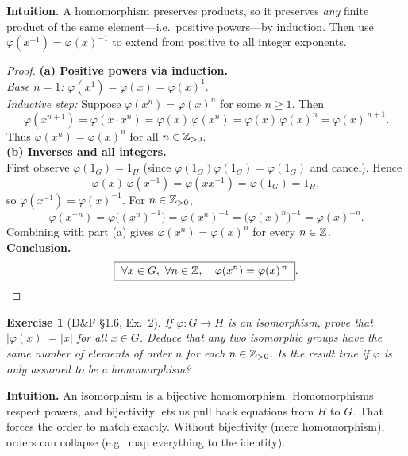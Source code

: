 \documentclass[12pt]{article}
\newtheorem{exercise}[theorem]{Exercise}
\theoremstyle{definition}
\begin{document}
\dotfill

\noindent\textbf{Intuition.}
A homomorphism preserves products, so it preserves \emph{any} finite product of the same element—i.e.\ positive powers—by induction.  
Then use $\varphi(x^{-1})=\varphi(x)^{-1}$ to extend from positive to all integer exponents.\\

\dotfill

\begin{proof}
\noindent\textbf{(a) Positive powers via induction.}\\
\noindent\emph{Base $n=1$:} $\varphi(x^1)=\varphi(x)=\varphi(x)^1$.\\
\noindent\emph{Inductive step:} Suppose $\varphi(x^n)=\varphi(x)^n$ for some $n\ge1$. Then
\[
\varphi(x^{n+1})=\varphi(x\cdot x^n)=\varphi(x)\,\varphi(x^n)=\varphi(x)\,\varphi(x)^n=\varphi(x)^{\,n+1}.
\]
Thus $\varphi(x^n)=\varphi(x)^n$ for all $n\in\Bbb Z_{>0}$.\\

\noindent\textbf{(b) Inverses and all integers.}\\
\noindent First observe $\varphi(1_G)=1_H$ (since $\varphi(1_G)\varphi(1_G)=\varphi(1_G)$ and cancel). Hence
\[
\varphi(x)\,\varphi(x^{-1})=\varphi(xx^{-1})=\varphi(1_G)=1_H,
\]
so $\varphi(x^{-1})=\varphi(x)^{-1}$. For $n\in\Bbb Z_{>0}$,
\[
\varphi(x^{-n})=\varphi\!\big((x^n)^{-1}\big)=\varphi(x^n)^{-1}=\big(\varphi(x)^n\big)^{-1}=\varphi(x)^{-n}.
\]
Combining with part (a) gives $\varphi(x^n)=\varphi(x)^n$ for every $n\in\Bbb Z$.\\

\noindent\textbf{Conclusion.}
\[
\boxed{\ \forall x\in G,\ \forall n\in\Bbb Z,\quad \varphi(x^n)=\varphi(x)^{\,n}\ }.
\]
\end{proof}

\newpage

\begin{exercise}[D\&F §1.6, Ex.~2]
If $\varphi:G\to H$ is an isomorphism, prove that $|\varphi(x)|=|x|$ for all $x\in G$. Deduce that any two isomorphic groups have the same number of elements of order $n$ for each $n\in\Bbb Z_{>0}$. Is the result true if $\varphi$ is only assumed to be a homomorphism?
\end{exercise}

\dotfill

\noindent\textbf{Intuition.}
An isomorphism is a bijective homomorphism. Homomorphisms respect powers, and bijectivity lets us pull back equations from $H$ to $G$. That forces the order to match exactly. Without bijectivity (mere homomorphism), orders can collapse (e.g.\ map everything to the identity).\\
\end{document}
